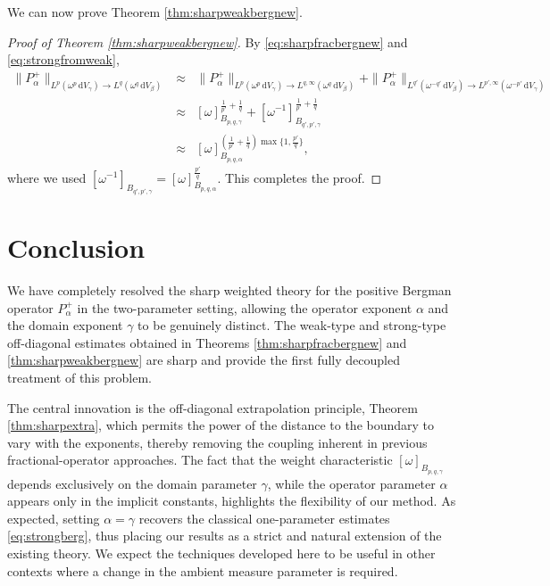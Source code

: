 \documentclass[a4paper,11pt,intlimits,oneside]{amsart}
\theoremstyle{definition}
\numberwithin{equation}{section}
\theoremstyle{definition}
\newcommand{\Beas}{\begin{eqnarray*}}
\newcommand{\Eeas}{\end{eqnarray*}}
\begin{document}
We can now prove Theorem \ref{thm:sharpweakbergnew}.
\begin{proof}[Proof of Theorem \ref{thm:sharpweakbergnew}]
By \eqref{eq:sharpfracbergnew} and \eqref{eq:strongfromweak},
\Beas
 \|P_{\alpha}^+\|_{L^p(\omega^p\,\mathrm{d}V_{\gamma})\longrightarrow L^q(\omega^q\,\mathrm{d}V_{\beta})} &\approx& \|P_{\alpha}^+\|_{L^p(\omega^p\,\mathrm{d}V_{\gamma})\longrightarrow L^{q,\infty}(\omega^q\,\mathrm{d}V_{\beta})}+\|P_{\alpha}^+\|_{L^{q'}(\omega^{-q'}\,\mathrm{d}V_{\beta})\longrightarrow L^{p',\infty}(\omega^{-p'}\,\mathrm{d}V_{\gamma})}\\ &\approx& [\omega]_{B_{p,q,\gamma}}^{\frac{1}{p'}+\frac{1}{q}}+[\omega^{-1}]_{B_{q',p',\gamma}}^{\frac{1}{p'}+\frac{1}{q}}\\ &\approx& [\omega]_{B_{p,q,\alpha}}^{\left(\frac{1}{p'}+\frac{1}{q}\right)\max\{1,\frac{p'}{q}\}},
\Eeas
where we used $[\omega^{-1}]_{B_{q',p',\gamma}}=[\omega]_{B_{p,q,\alpha}}^{\frac{p'}{q}}$. This completes the proof.
\end{proof}

 \section{Conclusion}

We have completely resolved the sharp weighted theory for the positive Bergman operator \(P_\alpha^+\) in the two-parameter setting, allowing the operator exponent \(\alpha\) and the domain exponent \(\gamma\) to be genuinely distinct. The weak-type and strong-type off-diagonal estimates obtained in Theorems \ref{thm:sharpfracbergnew} and \ref{thm:sharpweakbergnew} are sharp and provide the first fully decoupled treatment of this problem. 

The central innovation is the off-diagonal extrapolation principle, Theorem \ref{thm:sharpextra}, which permits the power of the distance to the boundary to vary with the exponents, thereby removing the coupling inherent in previous fractional-operator approaches. The fact that the weight characteristic \([\omega]_{B_{p,q,\gamma}}\) depends exclusively on the domain parameter \(\gamma\), while the operator parameter \(\alpha\) appears only in the implicit constants, highlights the flexibility of our method. As expected, setting \(\alpha=\gamma\) recovers the classical one-parameter estimates \eqref{eq:strongberg}, thus placing our results as a strict and natural extension of the existing theory. We expect the techniques developed here to be useful in other contexts where a change in the ambient measure parameter is required.
\end{document}
